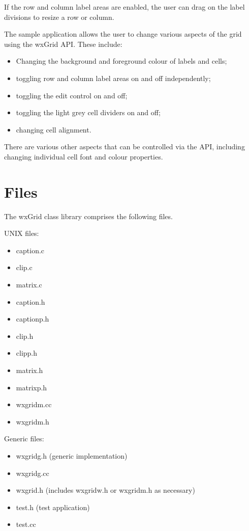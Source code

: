 If the row and column label areas are enabled, the user can drag on the label divisions
to resize a row or column.

The sample application allows the user to change various aspects of the grid using
the wxGrid API. These include:

\begin{itemize}\itemsep=0pt
\item Changing the background and foreground colour of labels and cells;
\item toggling row and column label areas on and off independently;
\item toggling the edit control on and off;
\item toggling the light grey cell dividers on and off;
\item changing cell alignment.
\end{itemize}

There are various other aspects that can be controlled via the API, including
changing individual cell font and colour properties.


\chapter{Files}\label{files}
%
\setfooter{\thepage}{}{}{}{}{\thepage}%

The wxGrid class library comprises the following files.

UNIX files:

\begin{itemize}\itemsep=0pt
\item caption.c
\item clip.c
\item matrix.c
\item caption.h
\item captionp.h
\item clip.h
\item clipp.h
\item matrix.h
\item matrixp.h
\item wxgridm.cc
\item wxgridm.h
\end{itemize}

Generic files:

\begin{itemize}\itemsep=0pt
\item wxgridg.h (generic implementation)
\item wxgridg.cc
\item wxgrid.h (includes wxgridw.h or wxgridm.h as necessary)
\item test.h (test application)
\item test.cc
\end{itemize}

